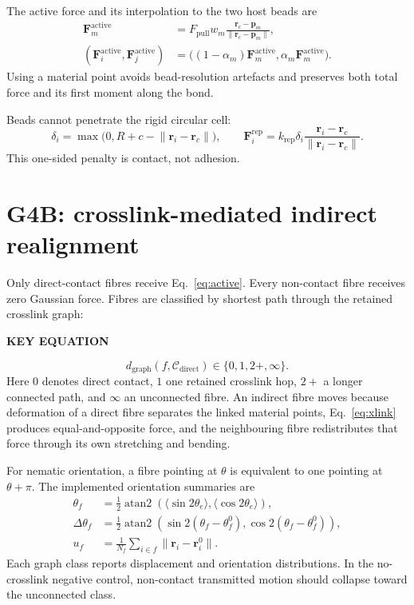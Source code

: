 \documentclass[10.5pt]{article}
\newcommand{\rv}{\mathbf r}
\newcommand{\Fv}{\mathbf F}
\newcommand{\keylabel}{\par\smallskip\noindent\textcolor{g4}{\textbf{KEY EQUATION}}\par\vspace{-5pt}}
\begin{document}
The active force and its interpolation to the two host beads are
\begin{align}
 \Fv_m^{\mathrm{active}}
 &=F_{\mathrm{pull}}w_m\frac{\rv_c-\mathbf p_m}{\lVert\rv_c-\mathbf p_m\rVert},\\
 (\Fv_i^{\mathrm{active}},\Fv_j^{\mathrm{active}})
 &=\big((1-\alpha_m)\Fv_m^{\mathrm{active}},\alpha_m\Fv_m^{\mathrm{active}}\big).
 \label{eq:active}
\end{align}
Using a material point avoids bead-resolution artefacts and preserves both total force and its
first moment along the bond.

Beads cannot penetrate the rigid circular cell:
\begin{equation}
 \delta_i=\max\big(0,R+c-\lVert\rv_i-\rv_c\rVert\big),\qquad
 \Fv_i^{\mathrm{rep}}=k_{\mathrm{rep}}\delta_i
 \frac{\rv_i-\rv_c}{\lVert\rv_i-\rv_c\rVert}.
 \label{eq:rep}
\end{equation}
This one-sided penalty is contact, not adhesion.

\section{G4B: crosslink-mediated indirect realignment}

Only direct-contact fibres receive Eq.~\eqref{eq:active}. Every non-contact fibre receives zero
Gaussian force. Fibres are classified by shortest path through the retained crosslink graph:
\keylabel
\begin{equation}
 d_{\mathrm{graph}}(f,\mathcal C_{\mathrm{direct}})\in\{0,1,2+,\infty\}.
 \label{eq:graph}
\end{equation}
Here $0$ denotes direct contact, $1$ one retained crosslink hop, $2+$ a longer connected path,
and $\infty$ an unconnected fibre. An indirect fibre moves because deformation of a direct fibre
separates the linked material points, Eq.~\eqref{eq:xlink} produces equal-and-opposite force, and
the neighbouring fibre redistributes that force through its own stretching and bending.

For nematic orientation, a fibre pointing at $\theta$ is equivalent to one pointing at
$\theta+\pi$. The implemented orientation summaries are
\begin{align}
 \theta_f&=\frac12\operatorname{atan2}
 \left(\langle\sin 2\theta_e\rangle,\langle\cos 2\theta_e\rangle\right),\\
 \Delta\theta_f&=\frac12\operatorname{atan2}
 \left(\sin 2(\theta_f-\theta_f^0),\cos 2(\theta_f-\theta_f^0)\right),\\
 u_f&=\frac{1}{N_f}\sum_{i\in f}\lVert\rv_i-\rv_i^0\rVert.
 \label{eq:metrics}
\end{align}
Each graph class reports displacement and orientation distributions. In the no-crosslink
negative control, non-contact transmitted motion should collapse toward the unconnected class.
\end{document}
